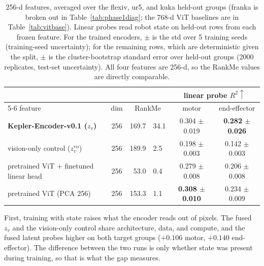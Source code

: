 \documentclass{article}
\begin{document}
\begin{table}[!htbp]
  \centering
  \small
  \caption{256-d features, averaged over the flexiv, ur5, and kuka held-out
  groups (franka is broken out in Table~\ref{tab:phase1diag}; the 768-d ViT baselines are in Table~\ref{tab:vitbase}). Linear probes read robot state on held-out rows from each frozen feature. For the trained encoders, $\pm$ is the std over 5 training seeds (training-seed uncertainty); for the remaining rows, which are deterministic given the split, $\pm$ is the cluster-bootstrap standard error over held-out groups (2000 replicates, test-set uncertainty). All four features are 256-d, so the RankMe values are directly comparable.}
  \label{tab:main}
  \begin{tabular}{lcr@{\,$\pm$\,}lcc}
    \toprule
    & & \multicolumn{2}{c}{} & \multicolumn{2}{c}{linear probe $R^2\uparrow$} \\
    \cmidrule(lr){5-6}
    feature & dim & \multicolumn{2}{c}{RankMe} & motor & end-effector \\
    \midrule
    \textbf{Kepler-Encoder-v0.1 ($z_v$)}       & 256 & 169.7 & 34.1 & 0.304 $\pm$0.019 & \textbf{0.282 $\pm$0.026} \\
    vision-only control ($z_v^{\mathrm{vo}}$)  & 256 & 189.9 & 2.5  & 0.198 $\pm$0.003 & 0.142 $\pm$0.003 \\
    pretrained ViT $+$ finetuned linear head   & 256 & 53.0  & 0.4  & 0.279 $\pm$0.008 & 0.206 $\pm$0.008 \\
    pretrained ViT (PCA 256)                   & 256 & 153.3 & 1.1  & \textbf{0.308 $\pm$0.010} & 0.234 $\pm$0.009 \\
    \bottomrule
  \end{tabular}
\end{table}

First, training with state raises what the encoder reads out of pixels. The fused $z_v$ and the vision-only control share architecture, data, and compute, and the fused latent probes higher on both target groups ($+0.106$ motor, $+0.140$ end-effector). The difference between the two runs is only whether state was present during training, so that is what the gap measures.
\end{document}
